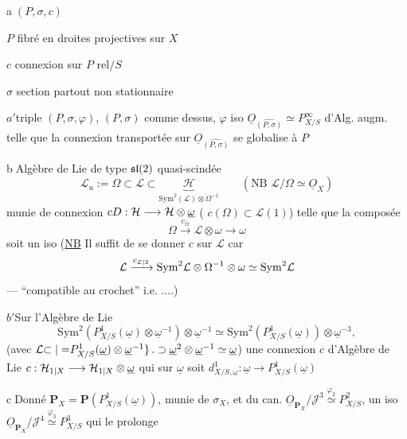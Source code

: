 \textcircled{a}\quad $(P,\sigma,c)$

$P$ fibré en droites projectives sur $X$

$c$ connexion sur $P$ rel$/S$

$\sigma$ section partout non stationnaire

\textcircled{$a'$}\quad triple $(P,\sigma,\varphi)$, $(P,\sigma)$ comme dessus,
$\varphi$ iso  $\underline O_{\widehat{(P,\sigma)}}\simeq P^\infty_{X/S}$ d'Alg. augm. telle que la connexion transportée sur $\underline O_{\widehat{(P,\sigma)}}$  se globalise à $P$

\textcircled{b}\quad Algèbre de Lie de type $\mathfrak{sl}({2})$ quasi-scindée
\[
\mathcal L_u:=\Omega\subset\mathcal L\subset\underbrace{\mathcal H}_{\mathrm{Sym}^2(\mathcal L)\otimes\Omega^{-1}}
\qquad(\text{NB }\mathcal L/\Omega\simeq\underline O_X)
\]
munie de connexion $c{{D}}:\mathcal H\longrightarrow\mathcal H\otimes\underline\omega$
( $c(\Omega)\subset\mathcal L(1)$) telle que la composée
\[
\Omega\xrightarrow{c_\Omega}\mathcal L\otimes\omega\longrightarrow\omega
\]
soit un iso (\uline{NB} Il suffit de se donner $c$ sur $\mathcal L$  car
\[
\mathcal L\xrightarrow{c_{{\mathcal L|2}}}\mathrm{Sym}^2\mathcal L\otimes\Omega^{-1}\otimes\omega\simeq\mathrm{Sym}^2\mathcal L
\]
--- ``compatible au crochet'' i.e. ....)

\textcircled{$b'$}\quad Sur l'Algèbre de Lie 
\[
\mathrm{Sym}^2(P^1_{X/S}(\underline\omega)\otimes\underline\omega^{-1})\otimes\underline\omega^{-1}
\simeq\mathrm{Sym}^2(P^1_{X/S}(\underline\omega))\otimes\underline\omega^{-3},
\]
(avec $\mathcal L{\subset|=}P^1_{X/S}(\underline\omega)\otimes\underline\omega^{-1}{\}\,.}\supset\underline\omega^2\otimes\underline\omega^{-1}\simeq\underline\omega$)
une connexion $c$ d'Algèbre de Lie
 $c:\mathcal H_{{1|X}}\longrightarrow\mathcal H_{{1|X}}\otimes\underline\omega$
qui sur $\underline\omega$ soit $d^1_{X/S,\underline\omega}:\underline\omega\longrightarrow P^1_{X/S}(\underline\omega)$

\textcircled{c}\quad Donné $\mathbf P_X=\mathbf P(P^1_{X/S}(\underline\omega))$, munie de $\sigma_X$, et du  can.
$\underline O_{\mathbf P_X}/\mathcal J^3\overset{\varphi_2}{\simeq}P^2_{X/S}$, un iso
$\underline O_{\mathbf P_X}/\mathcal J^4\overset{\varphi_3}{\simeq}P^3_{X/S}$ qui le prolonge

